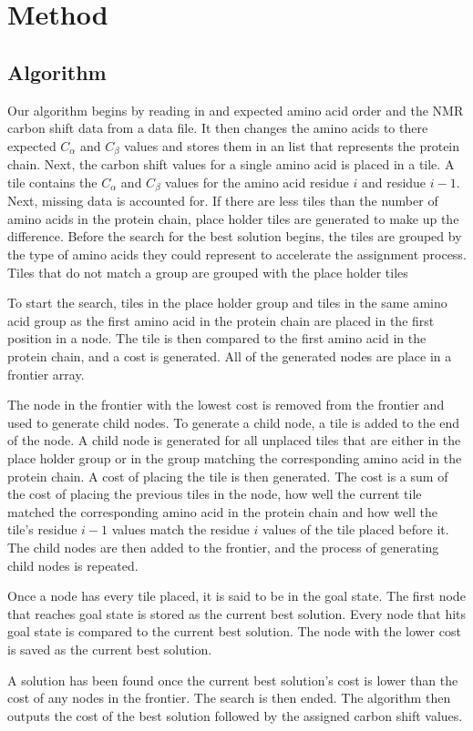 \documentclass[12pt]{article}
\begin{document}
\section{Method} %
\label{sec:method}

\subsection{Algorithm} %
\label{sub:algorithm}
Our algorithm begins by reading in and expected amino acid order and the NMR carbon shift data from a data file. It then changes the amino acids to there expected $C_\alpha$ and $C_{\beta}$ values and stores them in an list that represents the protein chain. Next, the carbon shift values for a single amino acid is placed in a tile. A tile contains the $C_\alpha$ and $C_{\beta}$ values for the amino acid residue $i$ and residue $i-1$. Next, missing data is accounted for. If there are less tiles than the number of amino acids in the protein chain, place holder tiles are generated to make up the difference. Before the search for the best solution begins, the tiles are grouped by the type of amino acids they could represent to accelerate the assignment process. Tiles that do not match a group are grouped with the place holder tiles

To start the search, tiles in the place holder group and tiles in the same amino acid group as the first amino acid in the protein chain are placed in the first position in a node. The tile is then compared to the first amino acid in the protein chain, and a cost is generated. All of the generated nodes are place in a frontier array. 

The node in the frontier with the lowest cost is removed from the frontier and used to generate child nodes. To generate a child node, a tile is added to the end of the node. A child node is generated for all unplaced tiles that are either in the place holder group or in the group matching the corresponding amino acid in the protein chain. A cost of placing the tile is then generated. The cost is a sum of the cost of placing the previous tiles in the node, how well the current tile matched the corresponding amino acid in the protein chain and how well the tile's residue $i-1$ values match the residue $i$ values of the tile placed before it. The child nodes are then added to the frontier, and the process of generating child nodes is repeated. 

Once a node has every tile placed, it is said to be in the goal state. The first node that reaches goal state is stored as the current best solution. Every node that hits goal state is compared to the current best solution. The node with the lower cost is saved as the current best solution.

A solution has been found once the current best solution's cost is lower than the cost of any nodes in the frontier. The search is then ended. The algorithm then outputs the cost of the best solution followed by the assigned carbon shift values. 



\end{document}
